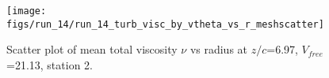 \begin{figure}[H]
\centering
\texttt{[image: figs/run\_14/run\_14\_turb\_visc\_by\_vtheta\_vs\_r\_meshscatter]}
\caption{Scatter plot of mean total viscosity $\nu$ vs radius at $z/c$=6.97, $V_{free}$=21.13, station 2.}
\label{fig:run_14_turb_visc_by_vtheta_vs_r_meshscatter}
\end{figure}


